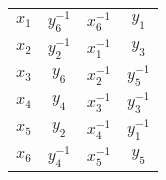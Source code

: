 \documentclass{article}
\begin{document}
\begin{table}[h]
\centering
\begin{tabular}{c c c c}
$x_{1}$ & $y_{6}^{-1}$ & $x_{6}^{-1}$ & $y_{1}$ \\
$x_{2}$ & $y_{2}^{-1}$ & $x_{1}^{-1}$ & $y_{3}$ \\
$x_{3}$ & $y_{6}$ & $x_{2}^{-1}$ & $y_{5}^{-1}$ \\
$x_{4}$ & $y_{4}$ & $x_{3}^{-1}$ & $y_{3}^{-1}$ \\
$x_{5}$ & $y_{2}$ & $x_{4}^{-1}$ & $y_{1}^{-1}$ \\
$x_{6}$ & $y_{4}^{-1}$ & $x_{5}^{-1}$ & $y_{5}$
\end{tabular}
\end{table}
\end{document}
